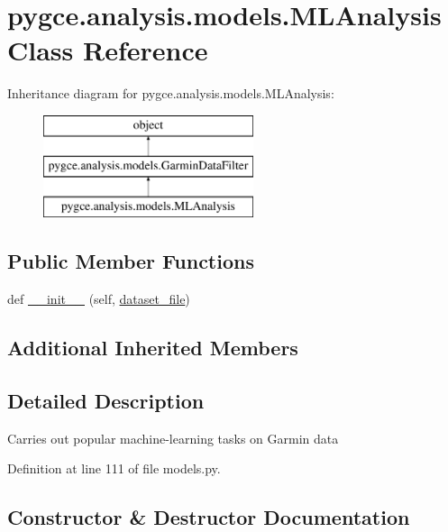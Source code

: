 \hypertarget{classpygce_1_1analysis_1_1models_1_1_m_l_analysis}{}\section{pygce.\+analysis.\+models.\+M\+L\+Analysis Class Reference}
\label{classpygce_1_1analysis_1_1models_1_1_m_l_analysis}
Inheritance diagram for pygce.\+analysis.\+models.\+M\+L\+Analysis\+:\begin{figure}[H]
\begin{center}
\leavevmode
\includegraphics[height=3.000000cm]{classpygce_1_1analysis_1_1models_1_1_m_l_analysis}
\end{center}
\end{figure}
\subsection*{Public Member Functions}
\begin{DoxyCompactItemize}
\item 
def \hyperlink{classpygce_1_1analysis_1_1models_1_1_m_l_analysis_a87a6dea18d5aa1163763e66f0142dca8}{\+\_\+\+\_\+init\+\_\+\+\_\+} (self, \hyperlink{classpygce_1_1analysis_1_1models_1_1_garmin_data_filter_a7bb7be05577c2d31546e27823a5d11c5}{dataset\+\_\+file})
\end{DoxyCompactItemize}
\subsection*{Additional Inherited Members}


\subsection{Detailed Description}
\begin{DoxyVerb}Carries out popular machine-learning tasks on Garmin data \end{DoxyVerb}
 

Definition at line 111 of file models.\+py.



\subsection{Constructor \& Destructor Documentation}
\mbox{\label{classpygce_1_1analysis_1_1models_1_1_m_l_analysis_a87a6dea18d5aa1163763e66f0142dca8}} 
